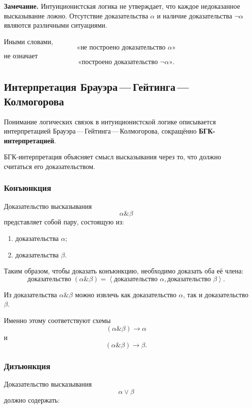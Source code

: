 \documentclass[12pt,a4paper,oneside,openany]{book}
\theoremstyle{definition}
\theoremstyle{plain}
\theoremstyle{remark}
\begin{document}
\textbf{Замечание.}
Интуиционистская логика не утверждает, что каждое недоказанное
высказывание ложно. Отсутствие доказательства \(\alpha\) и наличие
доказательства \(\neg\alpha\) являются различными ситуациями.

Иными словами,
\[
\text{«не построено доказательство }\alpha\text{»}
\]
не означает
\[
\text{«построено доказательство }\neg\alpha\text{»}.
\]

\subsection{Интерпретация Брауэра\,---\,Гейтинга\,---\,Колмогорова}

Понимание логических связок в интуиционистской логике
описывается интерпретацией
Брауэра\,---\,Гейтинга\,---\,Колмогорова, сокращённо
\textbf{БГК-интерпретацией}.

БГК-интерпретация объясняет смысл высказывания через то, что должно
считаться его доказательством.

\subsubsection{Конъюнкция}

Доказательство высказывания
\[
\alpha\mathbin{\&}\beta
\]
представляет собой пару, состоящую из:

\begin{enumerate}
    \item доказательства \(\alpha\);
    \item доказательства \(\beta\).
\end{enumerate}

Таким образом, чтобы доказать конъюнкцию, необходимо доказать оба её
члена:
\[
\text{доказательство }(\alpha\mathbin{\&}\beta)
=
\left\langle
\text{доказательство }\alpha,
\text{доказательство }\beta
\right\rangle.
\]

Из доказательства \(\alpha\mathbin{\&}\beta\) можно извлечь как
доказательство \(\alpha\), так и доказательство \(\beta\).

Именно этому соответствуют схемы
\[
(\alpha\mathbin{\&}\beta)\to\alpha
\]
и
\[
(\alpha\mathbin{\&}\beta)\to\beta.
\]

\subsubsection{Дизъюнкция}

Доказательство высказывания
\[
\alpha\lor\beta
\]
должно содержать:
\end{document}
